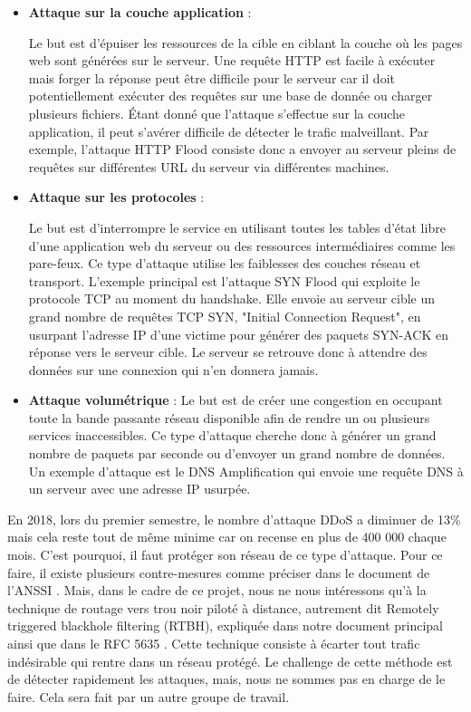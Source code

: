 \begin{itemize}
    \item \textbf{Attaque sur la couche application} :

    Le but est d'épuiser les ressources de la cible en ciblant la couche où les pages web sont générées sur le serveur. Une requête HTTP est facile à exécuter mais forger la réponse peut être difficile pour le serveur car il doit potentiellement exécuter des requêtes sur une base de donnée ou charger plusieurs fichiers. Étant donné que l'attaque s'effectue sur la couche application, il peut s'avérer difficile de détecter le trafic malveillant. Par exemple, l'attaque HTTP Flood consiste donc a envoyer au serveur pleins de requêtes sur différentes URL du serveur via différentes machines.

    \item \textbf{Attaque sur les protocoles} :

    Le but est d'interrompre le service en utilisant toutes les tables d'état libre d'une application web du serveur ou des ressources intermédiaires comme les pare-feux. Ce type d'attaque utilise les faiblesses des couches réseau et transport. L'exemple principal est l'attaque SYN Flood qui exploite le protocole TCP au moment du handshake. Elle envoie au serveur cible un grand nombre de requêtes TCP SYN, "Initial Connection Request", en usurpant l'adresse IP d'une victime pour générer des paquets SYN-ACK en réponse vers le serveur cible. Le serveur se retrouve donc à attendre des données sur une connexion qui n'en donnera jamais.

    \item \textbf{Attaque volumétrique} : Le but est de créer une congestion en occupant toute la bande passante réseau disponible afin de rendre un ou plusieurs services inaccessibles. Ce type d'attaque cherche donc à générer un grand nombre de paquets par seconde ou d'envoyer un grand nombre de données. Un exemple d'attaque est le DNS Amplification qui envoie une requête DNS à un serveur avec une adresse IP usurpée.
\end{itemize}

En 2018, lors du premier semestre, le nombre d'attaque DDoS a diminuer de 13\% mais cela reste tout de même minime car on recense en plus de 400 000 chaque mois. C'est pourquoi, il faut protéger son réseau de ce type d'attaque. Pour ce faire, il existe plusieurs contre-mesures comme préciser dans le document de l'ANSSI \cite{Ans15}. Mais, dans le cadre de ce projet, nous ne nous intéressons qu'à la technique de routage vers trou noir piloté à distance, autrement dit Remotely triggered blackhole filtering (RTBH), expliquée dans notre document principal \cite{Sys05} ainsi que dans le RFC 5635 \cite{Rfcrtbh09}. Cette technique consiste à écarter tout trafic indésirable qui rentre dans un réseau protégé. Le challenge de cette méthode est de détecter rapidement les attaques, mais, nous ne sommes pas en charge de le faire. Cela sera fait par un autre groupe de travail.

